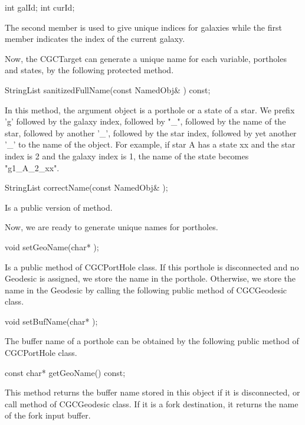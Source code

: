 \begin{example}
int galId;
int curId;
\end{example}

The second member is used to give unique indices for galaxies while the
first member indicates the index of the current galaxy.

Now, the CGCTarget can generate a unique name for each variable,
portholes and states, by the following protected method.

\begin{example}
StringList sanitizedFullName(const NamedObj& ) const;
\end{example}

In this method, the argument object is a porthole or a state of a star.
We prefix 'g' followed by the galaxy index, followed by "\_", followed
by the name of the star, followed by another '\_', followed by the star
index, followed by yet another '\_' to the name of the object. For example,
if star A has a state xx and the star index is 2 and the galaxy index is 1,
the name of the state becomes "g1\_A\_2\_xx".

\begin{example}
StringList correctName(const NamedObj& );
\end{example}

Is a public version of  method.

Now, we are ready to generate unique names for portholes.

\begin{example}
void setGeoName(char* );
\end{example}

Is a public method of CGCPortHole class. If this porthole is disconnected
and no Geodesic is assigned, we store the name in the porthole. Otherwise,
we store the name in the Geodesic by calling the following public method
of CGCGeodesic class.

\begin{example}
void setBufName(char* );
\end{example}

The buffer name of a porthole can be obtained by the following public
method of CGCPortHole class.

\begin{example}
const char* getGeoName() const;
\end{example}

This method returns the buffer name stored in this object if it is
disconnected, or call  method of CGCGeodesic class.
If it is a fork destination, it returns the name of the fork input buffer.

